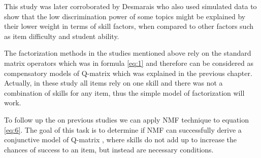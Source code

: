 This study was later corroborated by Desmarais \citep{desmarais2011conditions} who also used simulated data to show that the low discrimination power of some topics might be explained by their lower weight in terms of skill factors, when compared to other factors such as item difficulty and student ability.

The factorization methods in the studies mentioned above rely on the standard matrix operators which was in formula \ref{eq:1} and therefore can be considered as compensatory models of Q-matrix which was explained in the previous chapter. Actually, in these study all items rely on one skill and there was not a combination of skills for any item, thus the simple model of factorization will work. 

To follow up the on previous studies \citep{Barnes2005,desmarais2011conditions,Winters07} we can apply NMF technique to equation \ref{eq:6}. The goal of this task is to determine if NMF can successfully derive a conjunctive model of Q-matrix , where skills do not add up to increase the chances of success to an item, but instead are necessary conditions.







